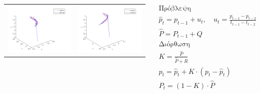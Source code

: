 \documentclass[8pt,sans,mathserif]{beamer}%
\begin{document}
\begin{frame}
\begin{columns}
\begin{tabular}{cc}
            \includegraphics[height = 0.23\textheight, keepaspectratio]{fig/filter0-xyz.png} & \includegraphics[height = 0.23\textheight, keepaspectratio]{fig/filter3-xyz.png}
        \end{tabular}

        \pause

        \begin{equation*}
            \begin{gathered}
                \text{Πρόβλεψη} \\
                \hat{p}_{t} = p_{t-1} + u_{t}, \quad u_{t} = \frac{p_{t-1} - p_{t-2}}{t_{t-1} - t_{t-2}} \\
                \hat{P} = P_{t-1} + Q \\[.5cm]
                \text{Διόρθωση} \\
                Κ = \frac{\hat{P}}{\hat{P} + R}\\
                p_{t} = \hat{p}_{t} + K \cdot (p_{t} - \hat{p}_{t}) \\
                P_{t} = (1 - K) \cdot \hat{P}
            \end{gathered}
        \end{equation*}
        

\end{columns}
\end{frame}
\end{document}
